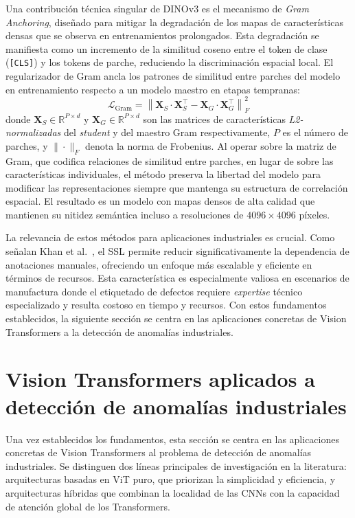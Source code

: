 Una contribución técnica singular de DINOv3 es el mecanismo de \textit{Gram Anchoring}, diseñado para mitigar la degradación de los mapas de características densas que se observa en entrenamientos prolongados. Esta degradación se manifiesta como un incremento de la similitud coseno entre el token de clase (\texttt{[CLS]}) y los tokens de parche, reduciendo la discriminación espacial local. El regularizador de Gram ancla los patrones de similitud entre parches del modelo en entrenamiento respecto a un modelo maestro en etapas tempranas:
\begin{equation}
\mathcal{L}_\text{Gram} = \left\| \mathbf{X}_S \cdot \mathbf{X}_S^\top - \mathbf{X}_G \cdot \mathbf{X}_G^\top \right\|_F^2
\label{eq:gram}
\end{equation}
donde $\mathbf{X}_S \in \mathbb{R}^{P \times d}$ y $\mathbf{X}_G \in \mathbb{R}^{P \times d}$ son las matrices de características \textit{L2-normalizadas} del \textit{student} y del maestro Gram respectivamente, $P$ es el número de parches, y $\|\cdot\|_F$ denota la norma de Frobenius. Al operar sobre la matriz de Gram, que codifica relaciones de similitud entre parches, en lugar de sobre las características individuales, el método preserva la libertad del modelo para modificar las representaciones siempre que mantenga su estructura de correlación espacial. El resultado es un modelo con mapas densos de alta calidad que mantienen su nitidez semántica incluso a resoluciones de $4096\times4096$ píxeles.

La relevancia de estos métodos para aplicaciones industriales es crucial. Como señalan Khan et al.~\cite{khan2024survey}, el SSL permite reducir significativamente la dependencia de anotaciones manuales, ofreciendo un enfoque más escalable y eficiente en términos de recursos. Esta característica es especialmente valiosa en escenarios de manufactura donde el etiquetado de defectos requiere \textit{expertise} técnico especializado y resulta costoso en tiempo y recursos. Con estos fundamentos establecidos, la siguiente sección se centra en las aplicaciones concretas de Vision Transformers a la detección de anomalías industriales.

\section{Vision Transformers aplicados a detección de anomalías industriales}

Una vez establecidos los fundamentos, esta sección se centra en las aplicaciones concretas de Vision Transformers al problema de detección de anomalías industriales. Se distinguen dos líneas principales de investigación en la literatura: arquitecturas basadas en ViT puro, que priorizan la simplicidad y eficiencia, y arquitecturas híbridas que combinan la localidad de las CNNs con la capacidad de atención global de los Transformers.

